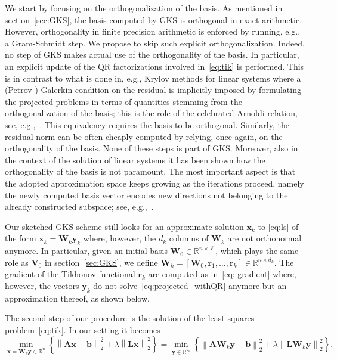 \documentclass[%
  a4paper,
  onecolumn,
  colorlinks,
]{preprint}
\theoremstyle{plain}
\theoremstyle{definition}
\newcommand{\R}{\ensuremath{\mathbb{R}}}
\newcommand{\norm}[1]{\left\|#1\right\|}
\newcommand{\bA}{\ensuremath{\boldsymbol{A}}}
\newcommand{\bL}{\ensuremath{\boldsymbol{L}}}
\newcommand{\bV}{\ensuremath{\boldsymbol{V}}}
\newcommand{\bW}{\ensuremath{\boldsymbol{W}}}
\newcommand{\bb}{\mathbf{b}}
\newcommand{\br}{\mathbf{r}}
\newcommand{\by}{\mathbf{y}}
\newcommand{\bx}{\mathbf{x}}
\begin{document}
We start by focusing on the orthogonalization of the basis. As mentioned in section~\ref{sec:GKS}, the basis computed by GKS is orthogonal in exact arithmetic.
However, orthogonality in finite precision arithmetic is enforced by running, e.g., a Gram-Schmidt step. We propose to skip such explicit orthogonalization. Indeed, no step of GKS makes actual use of the orthogonality of the basis. In particular, an explicit update of the QR factorizations involved in~\eqref{eq:tik} is performed. This is in contrast to what is done in, e.g., Krylov methods for linear systems where a (Petrov-) Galerkin condition on the residual is implicitly imposed by formulating the projected problems in terms of quantities stemming from the orthogonalization of the basis; this is the role of the celebrated Arnoldi relation, see, e.g.,~\cite{Saad2003}. This equivalency requires the basis to be orthogonal. Similarly, the residual norm can be often cheaply computed by relying, once again, on the orthogonality of the basis. None of these steps is part of GKS. Moreover, also in the context of the solution of linear systems it has been shown how the orthogonality of the basis is not paramount. The most important aspect is that the adopted approximation space keeps growing as the iterations proceed, namely the newly computed basis vector encodes new directions not belonging to the already constructed subspace; see, e.g.,~\cite{SimonciniSzyld2005}.


 Our sketched GKS scheme still looks for an approximate solution $\bx_k$ to \eqref{eq:ls} of the form $\bx_k=\bW_k\by_k$ where, however, the $d_k$ columns of $\bW_k$ are not orthonormal anymore. In particular, given an initial basis ${\bW}_0\in\mathbb{R}^{n\times \ell}$, which plays the same role as $\bV_0$ in section~\ref{sec:GKS}, we define
 ${\bW}_k=[{\bW}_0,\br_1,\ldots,\br_k]\in\mathbb{R}^{n\times d_k}$. The gradient of the Tikhonov functional $\br_k$ are computed as in~\eqref{eq: gradient} where, however, the vectors $\by_k$ do not solve~\eqref{eq:projected_withQR} anymore but an approximation thereof, as shown below.
 
The second step of our procedure is the solution of the least-squares problem~\eqref{eq:tik}. In our setting it becomes
\begin{equation}\label{eq:tik_new}
  \min_{\bx=\bW_k\by \in \R^n} \left\{ \norm{\bA\bx - \bb}_2^2 + \lambda\norm{\bL\bx}_2^2 \right\}=\min_{\by \in \R^{d_k}} \left\{ \norm{\bA\bW_k\by - \bb}_2^2 + \lambda\norm{\bL\bW_k\by}_2^2 \right\}.
\end{equation}
\end{document}
